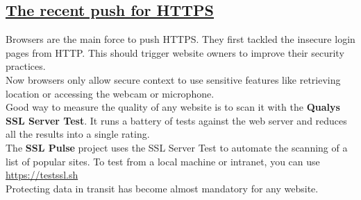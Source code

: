 \documentclass[titlepage]{article}
\begin{document}
    \subsection{\href{https://youtu.be/kfKDJX-6ipY}{The recent push for HTTPS}}
    Browsers are the main force to push HTTPS. They first tackled the insecure login pages from HTTP. This should trigger website owners to improve their security practices.\\
    Now browsers only allow secure context to use sensitive features like retrieving location or accessing the webcam or microphone.\\
    Good way to measure the quality of any website is to scan it with the \textbf{Qualys SSL Server Test}. It runs a battery of tests against the web server and reduces all the results into a single rating.\\
    The  \textbf{SSL Pulse} project uses the SSL Server Test to automate the scanning of a list of popular sites. To test from a local machine or intranet, you can use \url{https://testssl.sh}\\
    Protecting data in transit has become almost mandatory for any website.
\end{document}
